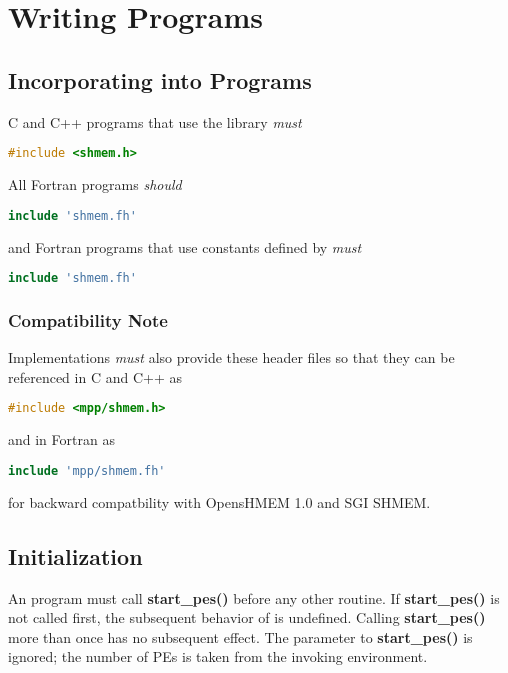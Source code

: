 \section{Writing \openshmem Programs}

\subsection{Incorporating \openshmem into Programs}


C and C++ programs that use the \openshmem library \emph{must}

\begin{lstlisting}[language=C++]
#include <shmem.h>
\end{lstlisting}

All Fortran \openshmem programs \emph{should}

\begin{lstlisting}[language=Fortran]
include 'shmem.fh'
\end{lstlisting}

and Fortran \openshmem programs that use constants defined by \openshmem
\emph{must}

\begin{lstlisting}[language=Fortran]
include 'shmem.fh'
\end{lstlisting}

\subsubsection{Compatibility Note}

Implementations \emph{must} also provide these header files so that
they can be referenced in C and C++ as

\begin{lstlisting}[language=C++]
#include <mpp/shmem.h>
\end{lstlisting}

and in Fortran as

\begin{lstlisting}[language=Fortran]
include 'mpp/shmem.fh'
\end{lstlisting}

for backward compatbility with OpensHMEM 1.0 and SGI SHMEM.

\subsection{Initialization}

An \openshmem program must call \textbf{start\_pes() }before any other \openshmem routine. If
\textbf{start\_pes()} is not called first, the subsequent behavior of
\openshmem is undefined.  Calling \textbf{start\_pes()} more than once
has no subsequent effect. The parameter to \textbf{start\_pes()} is
ignored; the number of PEs is taken from the invoking environment.

